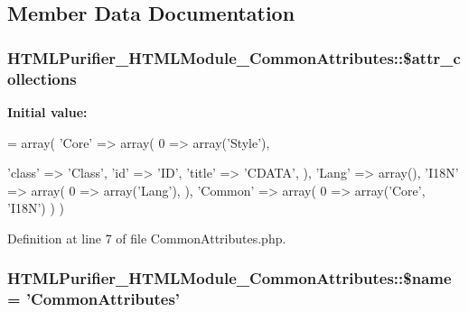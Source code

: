 \subsection{Member Data Documentation}
\hypertarget{classHTMLPurifier__HTMLModule__CommonAttributes_abafc686db980efbef653bf7b4d63189a}{
\subsubsection[{\$attr\+\_\+collections}]{\setlength{\rightskip}{0pt plus 5cm}H\+T\+M\+L\+Purifier\+\_\+\+H\+T\+M\+L\+Module\+\_\+\+Common\+Attributes\+::\$attr\+\_\+collections}}\label{classHTMLPurifier__HTMLModule__CommonAttributes_abafc686db980efbef653bf7b4d63189a}
{\bfseries Initial value\+:}
\begin{DoxyCode}
= array(
        \textcolor{stringliteral}{'Core'} => array(
            0 => array(\textcolor{stringliteral}{'Style'}),
            
            \textcolor{stringliteral}{'class'} => \textcolor{stringliteral}{'Class'},
            \textcolor{stringliteral}{'id'} => \textcolor{stringliteral}{'ID'},
            \textcolor{stringliteral}{'title'} => \textcolor{stringliteral}{'CDATA'},
        ),
        \textcolor{stringliteral}{'Lang'} => array(),
        \textcolor{stringliteral}{'I18N'} => array(
            0 => array(\textcolor{stringliteral}{'Lang'}), 
        ),
        \textcolor{stringliteral}{'Common'} => array(
            0 => array(\textcolor{stringliteral}{'Core'}, \textcolor{stringliteral}{'I18N'})
        )
    )
\end{DoxyCode}


Definition at line 7 of file Common\+Attributes.\+php.

\hypertarget{classHTMLPurifier__HTMLModule__CommonAttributes_a065ed49304a046fe8e04e8f2b36339c2}{
\subsubsection[{\$name}]{\setlength{\rightskip}{0pt plus 5cm}H\+T\+M\+L\+Purifier\+\_\+\+H\+T\+M\+L\+Module\+\_\+\+Common\+Attributes\+::\$name = 'Common\+Attributes'}}\label{classHTMLPurifier__HTMLModule__CommonAttributes_a065ed49304a046fe8e04e8f2b36339c2}


